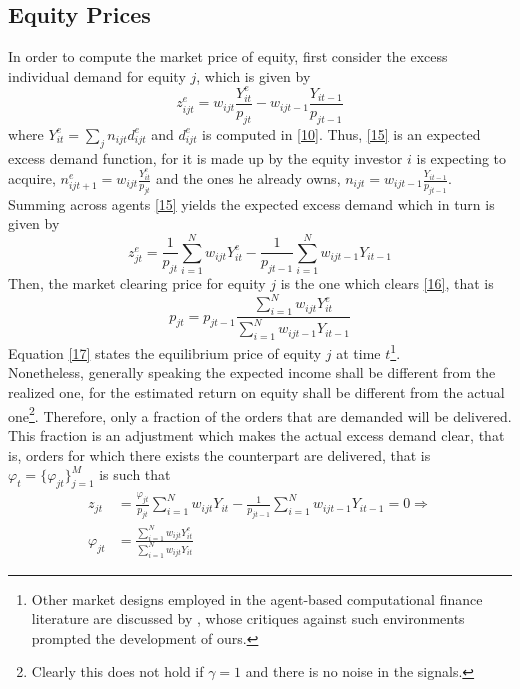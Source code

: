 \documentclass[11pt]{article}
\begin{document}
\subsection{Equity Prices}
In order to compute the market price of equity, first consider the excess individual demand for equity $j$, which is given by
\begin{equation}\label{15}
	z^e_{ijt} = w_{ijt} \frac{Y^e_{it}}{p_{jt}} - w_{ijt-1} \frac{Y_{it-1}}{p_{jt-1}}
\end{equation}
where $Y^e_{it} = \sum_j n_{ijt} d^e_{ijt}$ and $d^e_{ijt}$ is computed in \eqref{10}. Thus, \eqref{15} is an expected excess demand function, for it is made up by the equity investor $i$ is expecting to acquire, $n^e_{ijt+1} =w_{ijt} \frac{Y^e_{it}}{p_{jt}}$ and the ones he already owns, $n_{ijt} =  w_{ijt-1} \frac{Y_{it-1}}{p_{jt-1}}$.\\
Summing across agents \eqref{15} yields the expected excess demand which in turn is given by
\begin{equation}\label{16}
	z^e_{jt} = \frac{1}{p_{jt}} \sum_{i=1}^N w_{ijt} Y^e_{it} - \frac{1}{p_{jt-1}} \sum_{i=1}^N w_{ijt-1}Y_{it-1}
\end{equation}	
Then, the market clearing price for equity $j$ is the one which clears \eqref{16}, that is
\begin{equation}\label{17}
	p_{jt} = p_{jt-1} \frac{\sum_{i=1}^N w_{ijt} Y^e_{it}}{\sum_{i=1}^N w_{ijt-1} Y_{it-1}}
\end{equation}
Equation \eqref{17} states the equilibrium price of equity $j$ at time $t$\footnote{Other market designs employed in the agent-based computational finance literature are discussed by \citet{5}, whose critiques against such environments prompted the development of ours.}. \\Nonetheless, generally speaking the expected income shall be different from the realized one, for the estimated return on equity shall be different from the actual one\footnote{Clearly this does not hold if $\gamma=1$ and there is no noise in the signals.}. Therefore, only a fraction of the orders that are demanded will be delivered. This fraction is an adjustment which makes the actual excess demand clear, that is, orders for which there exists the counterpart are delivered, that is $\varphi_t = \{ \varphi_{jt} \}_{j=1}^M$ is such that
\begin{equation}\label{18}
\begin{aligned}
	z_{jt} &= \frac{\varphi_{jt}}{p_{jt}} \sum_{i=1}^N w_{ijt}Y_{it} - \frac{1}{p_{jt-1}} \sum_{i=1}^N w_{ijt-1}Y_{it-1} =0 \Rightarrow\\
	\varphi_{jt} &= \frac{\sum_{i=1}^N w_{ijt} Y^e_{it}}{\sum_{i=1}^N w_{ijt} Y_{it}}
\end{aligned}
\end{equation}
\end{document}
